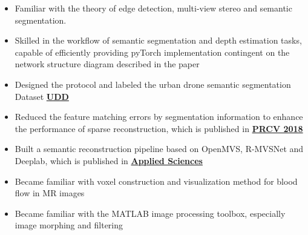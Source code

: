 \documentclass{resume}
\begin{document}
\begin{itemize}
    \item Familiar with the theory of edge detection, multi-view stereo and semantic segmentation.
    \item Skilled in the workflow of semantic segmentation and depth estimation tasks, capable of efficiently providing pyTorch implementation contingent on the network structure diagram described in the paper
	\item Designed the protocol and labeled the urban drone semantic segmentation Dataset \href{https://mrright.wang/UDD/}{\textbf{UDD}}
	\item Reduced the feature matching errors by segmentation information to enhance the performance of sparse reconstruction, which is published in \href{https://link.springer.com/content/pdf/10.1007\%2F978-3-030-03398-9_30.pdf}{\textbf{PRCV 2018}}
    \item Built a semantic reconstruction pipeline based on OpenMVS, R-MVSNet and Deeplab, which is published in  \href{https://www.mdpi.com/2076-3417/10/4/1275/pdf}{\textbf{Applied Sciences}}

\end{itemize}


\begin{itemize}
  \item Became familiar with voxel construction and visualization method for blood flow in MR images
  \item Became familiar with the MATLAB image processing toolbox, especially image morphing and filtering
\end{itemize}


\end{document}
